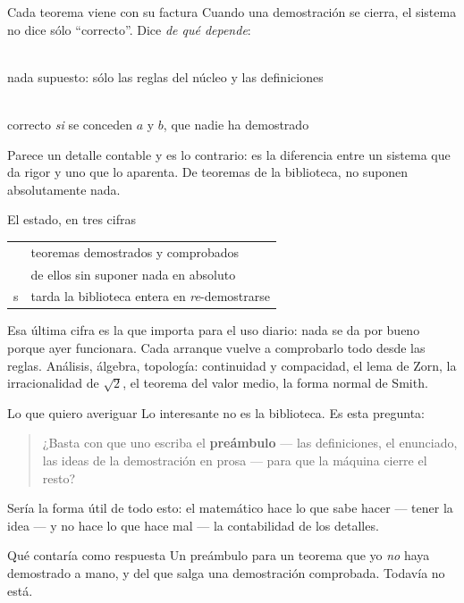 \documentclass[11pt,aspectratio=169]{beamer}
\begin{document}
\begin{frame}{Cada teorema viene con su factura}
  Cuando una demostración se cierra, el sistema no dice sólo ``correcto''.
  Dice \emph{de qué depende}:
  \vfill
  \begin{center}
     \\[0.5ex]
    {\small nada supuesto: sólo las reglas del núcleo y las definiciones}
  \end{center}
  \vfill
  \begin{center}
     \\[0.5ex]
    {\small correcto \emph{si} se conceden $a$ y $b$, que nadie ha demostrado}
  \end{center}
  \vfill
  Parece un detalle contable y es lo contrario: es la diferencia entre un
  sistema que da rigor y uno que lo aparenta. De \Nproven{} teoremas de la
  biblioteca, \Nmodzero{} no suponen absolutamente nada.
\end{frame}

\begin{frame}{El estado, en tres cifras}
  \begin{center}
    \begin{tabular}{rl}
      \toprule
      \Nproven{} & teoremas demostrados y comprobados \\
      \Nmodzero{} & de ellos sin suponer nada en absoluto \\
      \Nload{} s & tarda la biblioteca entera en \emph{re}-demostrarse \\
      \bottomrule
    \end{tabular}
  \end{center}
  \vfill
  Esa última cifra es la que importa para el uso diario: nada se da por bueno
  porque ayer funcionara. Cada arranque vuelve a comprobarlo todo desde las
  reglas.
  \vfill
  {\small Análisis, álgebra, topología: continuidad y compacidad, el lema de
   Zorn, la irracionalidad de $\sqrt{2}$, el teorema del valor medio, la forma
   normal de Smith.}
\end{frame}

\begin{frame}{Lo que quiero averiguar}
  Lo interesante no es la biblioteca. Es esta pregunta:
  \vfill
  \begin{quote}
    \large
    ¿Basta con que uno escriba el \textbf{preámbulo} --- las definiciones, el
    enunciado, las ideas de la demostración en prosa --- para que la máquina
    cierre el resto?
  \end{quote}
  \vfill
  Sería la forma útil de todo esto: el matemático hace lo que sabe hacer
  --- tener la idea --- y no hace lo que hace mal --- la contabilidad de los
  detalles.
  \vfill
  \begin{block}{Qué contaría como respuesta}
    Un preámbulo para un teorema que yo \emph{no} haya demostrado a mano, y del
    que salga una demostración comprobada. Todavía no está.
  \end{block}
\end{frame}
\end{document}
